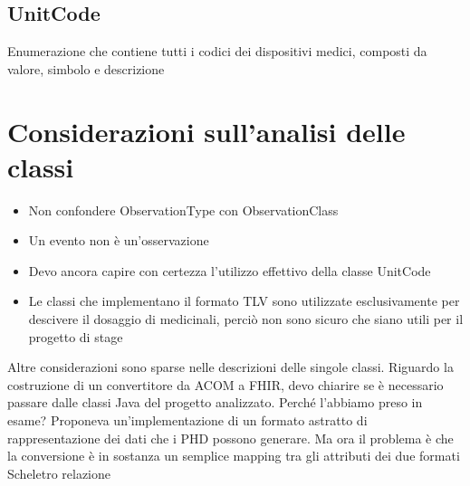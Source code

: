 \documentclass[a4paper]{article}
\begin{document}
        \subsection{UnitCode}
            Enumerazione che contiene tutti i codici dei dispositivi medici, composti da valore, simbolo e descrizione
    \section{Considerazioni sull'analisi delle classi}
        \begin{itemize}
            \item Non confondere ObservationType con ObservationClass
            \item Un evento non è un'osservazione
            \item Devo ancora capire con certezza l'utilizzo effettivo della classe UnitCode
            \item Le classi che implementano il formato TLV sono utilizzate esclusivamente per descivere il dosaggio di medicinali, perciò non sono sicuro che siano utili per il progetto di stage
        \end{itemize}
        Altre considerazioni sono sparse nelle descrizioni delle singole classi.
        Riguardo la costruzione di un convertitore da ACOM a FHIR, devo chiarire se è necessario passare dalle classi Java
        del progetto analizzato. Perché l'abbiamo preso in esame? Proponeva un'implementazione di un formato astratto di rappresentazione 
        dei dati che i PHD possono generare. Ma ora il problema è che la conversione è in sostanza un semplice mapping tra gli attributi dei due formati
        \newpage
        Scheletro relazione
\end{document}
